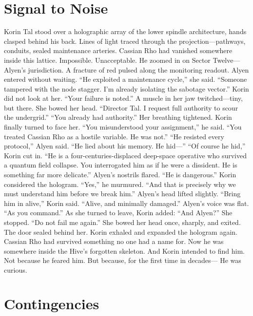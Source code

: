 \documentclass[12pt,oneside]{book}
\begin{document}
\chapter{Signal to Noise}

Korin Tal stood over a holographic array of the lower spindle architecture, hands clasped behind his back. Lines of light traced through the projection—pathways, conduits, sealed maintenance arteries.
Cassian Rho had vanished somewhere inside this lattice.
Impossible.
Unacceptable.
He zoomed in on Sector Twelve—Alyen’s jurisdiction. A fracture of red pulsed along the monitoring readout.
Alyen entered without waiting.
“He exploited a maintenance cycle,” she said. “Someone tampered with the node stagger. I’m already isolating the sabotage vector.”
Korin did not look at her. “Your failure is noted.”
A muscle in her jaw twitched—tiny, but there.
She bowed her head. “Director Tal. I request full authority to scour the undergrid.”
“You already had authority.”
Her breathing tightened.
Korin finally turned to face her.
“You misunderstood your assignment,” he said. “You treated Cassian Rho as a hostile variable. He was not.”
“He resisted every protocol,” Alyen said. “He lied about his memory. He hid—”
“Of course he hid,” Korin cut in. “He is a four-centuries-displaced deep-space operative who survived a quantum field collapse. You interrogated him as if he were a dissident. He is something far more delicate.”
Alyen’s nostrils flared. “He is dangerous.”
Korin considered the hologram.
“Yes,” he murmured. “And that is precisely why we must understand him before we break him.”
Alyen’s head lifted slightly.
“Bring him in alive,” Korin said. “Alive, and minimally damaged.”
Alyen’s voice was flat. “As you command.”
As she turned to leave, Korin added:
“And Alyen?”
She stopped.
“Do not fail me again.”
She bowed her head once, sharply, and exited.
The door sealed behind her.
Korin exhaled and expanded the hologram again.
Cassian Rho had survived something no one had a name for.
Now he was somewhere inside the Hive’s forgotten skeleton.
And Korin intended to find him.
Not because he feared him.
But because, for the first time in decades—
He was curious.



\chapter{Contingencies}
\end{document}
